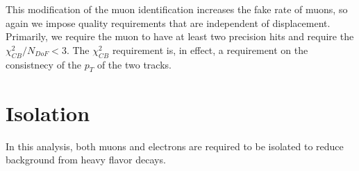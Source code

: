 This modification of the muon identification increases the fake rate of muons, so again we impose quality requirements that are independent of displacement. Primarily, we require the muon to have at least two precision hits and require the $\chi^{2}_{CB}/N_{DoF} < 3$. The $\chi^{2}_{CB}$ requirement is, in effect, a requirement on the consistnecy of the $p_{T}$ of the two tracks. 







\section{Isolation}
In this analysis, both muons and electrons are required to be isolated to reduce background from heavy flavor decays. 



